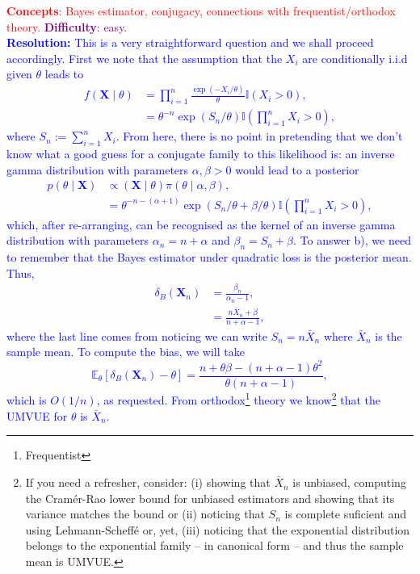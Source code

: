 \textcolor{red}{\textbf{Concepts}: Bayes estimator, conjugacy, connections with frequentist/orthodox theory.}
\textcolor{purple}{\textbf{Difficulty}: easy.}\\
\textcolor{blue}{
\textbf{Resolution:} 
This is a very straightforward question and we shall proceed accordingly.
First we note that the assumption that the $X_i$ are conditionally i.i.d given $\theta$ leads to
\begin{align*}
    f\left(\boldsymbol{X} \mid \theta \right) &= \prod_{i=1}^n \frac{\exp(-X_i/\theta)}{\theta}\mathbb{I}(X_i > 0),\\
    &= \theta^{-n} \exp\left(S_n/\theta\right) \mathbb{I}\left(\prod_{i=1}^n X_i > 0\right), 
\end{align*}
where $S_n := \sum_{i=1}^n X_i$.
From here, there is no point in pretending that we don't know what a good guess for a conjugate family to this likelihood is: an inverse gamma distribution with parameters $\alpha,\beta > 0$ would lead to a posterior
\begin{align*}
    p\left(\theta \mid \boldsymbol{X}\right) &\propto \left(\boldsymbol{X} \mid \theta \right)\pi(\theta \mid \alpha, \beta),\\
    &= \theta^{-n - (\alpha+1)}\exp\left(S_n/\theta + \beta/\theta \right) \mathbb{I}\left(\prod_{i=1}^n X_i > 0\right),
\end{align*}
which, after re-arranging, can be recognised as the kernel of an inverse gamma distribution with parameters $\alpha_n = n + \alpha$ and $\beta_n = S_n + \beta$.
To answer b), we need to remember that the Bayes estimator under quadratic loss is the posterior mean.
Thus, 
\begin{align*}
    \delta_B(\boldsymbol{X}_n) &= \frac{\beta_n}{\alpha_n - 1},\\
    &= \frac{n\bar{X}_n + \beta}{ n+ \alpha - 1},
\end{align*}
where the last line comes from noticing we can write $S_n = n\bar{X}_n$ where $\bar{X}_n$ is the sample mean.
To compute the bias, we will take
\begin{equation*}
    \mathbb{E}_\theta\left[\delta_B(\boldsymbol{X}_n) - \theta \right] = \frac{n + \theta \beta -(n+ \alpha - 1)\theta^2}{\theta (n+ \alpha - 1)},
\end{equation*}
which is $O(1/n)$, as requested.
From orthodox\footnote{Frequentist} theory we know\footnote{If you need a refresher, consider: (i) showing that $\bar{X}_n$ is unbiased, computing the Cramér-Rao lower bound for unbiased estimators and showing that its variance matches the bound or (ii) noticing that $S_n$ is complete suficient and using Lehmann-Scheffé or, yet, (iii) noticing that the exponential distribution belongs to the exponential family -- in canonical form -- and thus the sample mean is UMVUE.} that the UMVUE for $\theta$ is $\bar{X}_n$.
}
